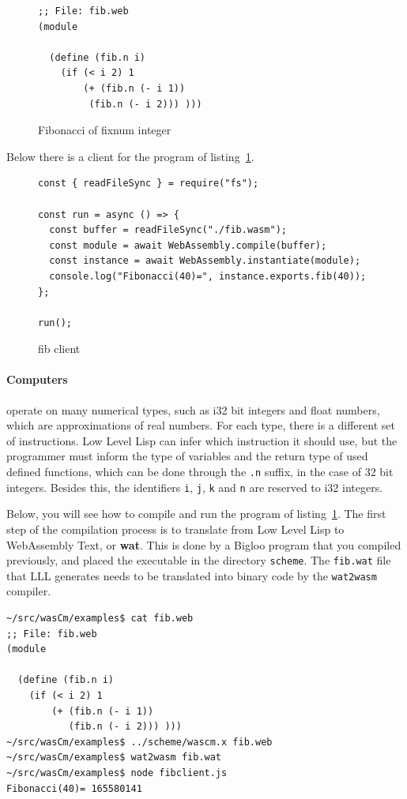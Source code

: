 \documentclass[a4paper,12pt]{book}
\begin{document}
\begin{figure}[!h]
\begin{verbatim}
;; File: fib.web
(module

  (define (fib.n i)
    (if (< i 2) 1
        (+ (fib.n (- i 1))
	     (fib.n (- i 2))) )))
\end{verbatim}
  \caption{Fibonacci of fixnum integer}
  \label{wasm:fixnum-fibonacci}
\end{figure}

Below there is a client for the program of
listing~\ref{wasm:fixnum-fibonacci}.

\begin{figure}[!h]
\begin{verbatim}
const { readFileSync } = require("fs");

const run = async () => {
  const buffer = readFileSync("./fib.wasm");
  const module = await WebAssembly.compile(buffer);
  const instance = await WebAssembly.instantiate(module);
  console.log("Fibonacci(40)=", instance.exports.fib(40));
};

run();
\end{verbatim}
  \caption{fib client}
  \label{wasm:fibclient}
\end{figure}

\paragraph{Computers} operate on many numerical types,
such as i32 bit integers and float numbers, which are
approximations of real numbers. For each type, there is
a different set of instructions. Low Level Lisp can infer
which instruction it should use, but the programmer must
inform the type of variables and the return type
of used defined functions, which can be done through
the \verb|.n| suffix, in the case of 32 bit integers.
Besides this, the identifiers \verb|i|, \verb|j|,
\verb|k| and \verb|n| are reserved to i32 integers.

Below, you will see how to compile and run the
program of listing~\ref{wasm:fixnum-fibonacci}.
The first step of the compilation process is to
translate from Low Level Lisp to WebAssembly Text,
or {\bf wat}. This is done by a Bigloo program that
you compiled previously, and placed the executable
in the directory \verb|scheme|. The \verb|fib.wat|
file that LLL generates needs to be translated into
binary code by the \verb|wat2wasm| compiler.
\begin{verbatim}
~/src/wasCm/examples$ cat fib.web
;; File: fib.web
(module

  (define (fib.n i)
    (if (< i 2) 1
        (+ (fib.n (- i 1))
           (fib.n (- i 2))) )))
~/src/wasCm/examples$ ../scheme/wascm.x fib.web
~/src/wasCm/examples$ wat2wasm fib.wat
~/src/wasCm/examples$ node fibclient.js
Fibonacci(40)= 165580141
\end{verbatim}
\end{document}
